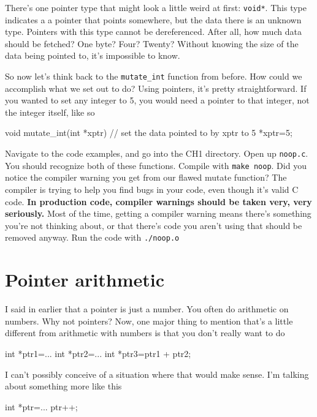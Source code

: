 \documentclass[ebook,11pt,oneside,openany]{memoir}
\newcommand{\cf}[1]{\texttt{#1}}
\begin{document}
There's one pointer type that might look a little weird at first: \texttt{void*}. This type indicates a a pointer that points somewhere, but the data there is an unknown type. Pointers with this type cannot be dereferenced. After all, how much data should be fetched? One byte? Four? Twenty? Without knowing the size of the data being pointed to, it's impossible to know.

So now let's think back to the \cf{mutate\_int} function from before. How could we accomplish what we set out to do? Using pointers, it's pretty straightforward. If you wanted to set any integer to 5, you would need a pointer to that integer, not the integer itself, like so

\begin{code}[language=C]
void mutate_int(int *xptr)
{
  // set the data pointed to by xptr to 5
  *xptr=5;
}
\end{code}

Navigate to the code examples, and go into the CH1 directory. Open up \cf{noop.c}. You should recognize both of these functions. Compile with \cf{make noop}. Did you notice the compiler warning you get from our flawed mutate function? The compiler is trying to help you find bugs in your code, even though it's valid C code. \textbf{In production code, compiler warnings should be taken very, very seriously.} Most of the time, getting a compiler warning means there's something you're not thinking about, or that there's code you aren't using that should be removed anyway. Run the code with \cf{./noop.o}

\section{Pointer arithmetic}

I said in earlier that a pointer is just a number. You often do arithmetic on numbers. Why not pointers? Now, one major thing to mention that's a little different from arithmetic with numbers is that you don't really want to do 

\begin{code}[language=C]
int *ptr1=...
int *ptr2=...
int *ptr3=ptr1 + ptr2;
\end{code}

I can't possibly conceive of a situation where that would make sense. I'm talking about something more like this

\begin{code}[language=C]
int *ptr=...
ptr++;
\end{code}
\end{document}
